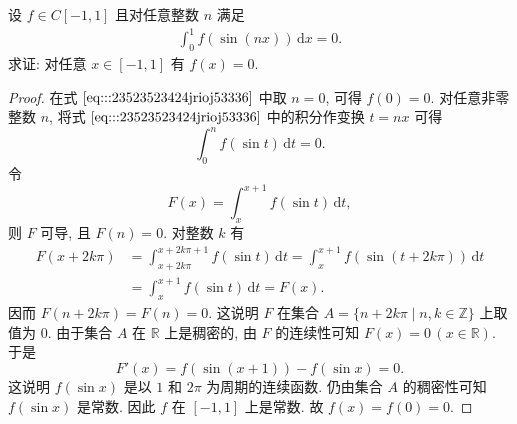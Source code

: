 \documentclass[../../main.tex]{subfiles}%
\begin{document}
\begin{example}
设 \( f \in C[-1,1] \) 且对任意整数 \( n \) 满足  
\begin{align}
\int_{0}^{1} f(\sin(nx)) \, \mathrm{d}x = 0. \label{eq:::23523523424jrioj53336}
\end{align}  
求证: 对任意 \( x \in [-1,1] \) 有 \( f(x) = 0 \).  
\end{example}
\begin{proof}

在式 \(\eqref{eq:::23523523424jrioj53336}\) 中取 \( n = 0 \), 可得 \( f(0) = 0 \). 对任意非零整数 \( n \), 将式 \(\eqref{eq:::23523523424jrioj53336}\) 中的积分作变换 \( t = nx \) 可得  
\[
\int_{0}^{n} f(\sin t) \, \mathrm{d}t = 0.
\]  
令 
\[
F(x) = \int_{x}^{x + 1} f(\sin t) \, \mathrm{d}t,
\]  
则 \( F \) 可导, 且 \( F(n) = 0 \). 对整数 \( k \) 有  
\[
\begin{aligned}
F(x + 2k\pi) &= \int_{x + 2k\pi}^{x + 2k\pi + 1} f(\sin t) \, \mathrm{d}t = \int_{x}^{x + 1} f(\sin(t + 2k\pi)) \, \mathrm{d}t \\
&= \int_{x}^{x + 1} f(\sin t) \, \mathrm{d}t = F(x).
\end{aligned}
\]  
因而 \( F(n + 2k\pi) = F(n) = 0 \). 这说明 \( F \) 在集合 \( A = \{ n + 2k\pi \mid n, k \in \mathbb{Z} \} \) 上取值为 \( 0 \). 由于集合 \( A \) 在 \( \mathbb{R} \) 上是稠密的, 由 \( F \) 的连续性可知 \( F(x) = 0 \, (x \in \mathbb{R}) \). 于是  
\[
F'(x) = f(\sin(x + 1)) - f(\sin x) = 0.
\]  
这说明 \( f(\sin x) \) 是以 \( 1 \) 和 \( 2\pi \) 为周期的连续函数. 仍由集合 \( A \) 的稠密性可知 \( f(\sin x) \) 是常数. 因此 \( f \) 在 \( [-1,1] \) 上是常数. 故 \( f(x) = f(0) = 0 \).

\end{proof}
\end{document}
